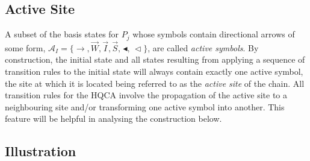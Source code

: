 \documentclass[11pt,letterpaper]{article}
\newcommand{\<}{\langle}
\renewcommand{\>}{\rangle}
\newcommand{\gat}{\,\blacktriangleleft}  %
\newcommand{\mov}{\,\vartriangleleft}    %
\newcommand{\ri}{\overrightarrow{I}}
\newcommand{\rw}{\overrightarrow{W}}
\newcommand{\rs}{\overrightarrow{S}}
\begin{document}
\subsection{Active Site}

A subset of the basis states for $P_j$ whose symbols contain directional arrows of some form, $\mathcal{A}_I=\{\rightarrow,\rw,\ri,\rs,\gat,\mov\}$, are called \emph{active symbols}. By construction, the initial state and all states resulting from applying a sequence of transition rules to the initial state will always contain exactly one active symbol, the site at which it is located being referred to as the \emph{active site} of the chain. All transition rules for the HQCA involve the propagation of the active site to a neighbouring site and/or transforming one active symbol into another. This feature will be helpful in analysing the construction below.

\subsection{Illustration}
\end{document}
